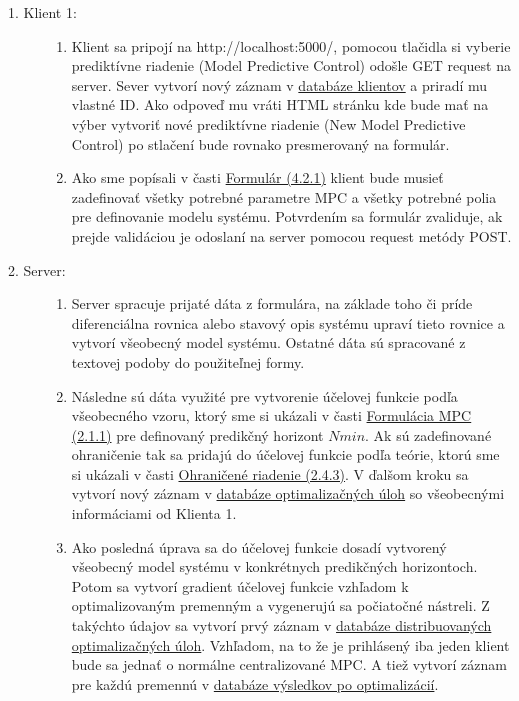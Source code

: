 \begin{description}
\item[1. Klient 1:]{\hfill
	\begin{enumerate}
		\item{
			Klient sa pripojí na http://localhost:5000/, pomocou tlačidla si vyberie prediktívne riadenie (Model Predictive Control) odošle GET request na server. Sever vytvorí nový záznam v \hyperref[DB:Klient]{databáze klientov} a priradí mu vlastné ID. Ako odpoveď mu vráti HTML stránku kde bude mať na výber vytvoriť nové prediktívne riadenie (New Model Predictive Control) po stlačení bude rovnako presmerovaný na formulár.
		}
		\item{
			Ako sme popísali v časti \hyperref[subse:Formular]{Formulár (4.2.1)} klient bude musieť zadefinovať všetky potrebné parametre MPC a všetky potrebné polia pre definovanie modelu systému. Potvrdením sa formulár zvaliduje, ak prejde validáciou je odoslaní na server pomocou request metódy POST.
		}
	\end{enumerate}
}
\item[2. Server:]{\hfill
	\begin{enumerate}
		\item{
			Server spracuje prijaté dáta z formulára, na základe toho či príde diferenciálna rovnica alebo stavový opis systému upraví tieto rovnice a vytvorí všeobecný model systému. Ostatné dáta sú spracované z textovej podoby do použiteľnej formy.
		}
		\item{
			Následne sú dáta využité pre vytvorenie účelovej funkcie podľa všeobecného vzoru, ktorý sme si ukázali v časti \hyperref[subse:MPC]{Formulácia MPC (2.1.1)} pre definovaný predikčný horizont $Nmin$. Ak sú zadefinované ohraničenie tak sa pridajú do účelovej funkcie podľa teórie, ktorú sme si ukázali v časti \hyperref[subse:Ohranicenia]{Ohraničené riadenie (2.4.3)}. V ďalšom kroku sa vytvorí nový záznam v \hyperref[DB:OPT]{databáze optimalizačných úloh} so všeobecnými informáciami od Klienta 1.
		}
		\item{
			 Ako posledná úprava sa do účelovej funkcie dosadí vytvorený všeobecný model systému v konkrétnych predikčných horizontoch. Potom sa vytvorí gradient účelovej funkcie vzhľadom k optimalizovaným premenným a vygenerujú sa počiatočné nástreli. Z takýchto údajov sa vytvorí prvý záznam v \hyperref[DB:WORKER]{databáze distribuovaných optimalizačných úloh}. Vzhľadom, na to že je prihlásený iba jeden klient bude sa jednať o normálne centralizované MPC. A tiež vytvorí záznam pre každú premennú v \hyperref[DB:WORKER_DATA]{databáze výsledkov po optimalizácií}.
}
\end{enumerate}}
\end{description}
